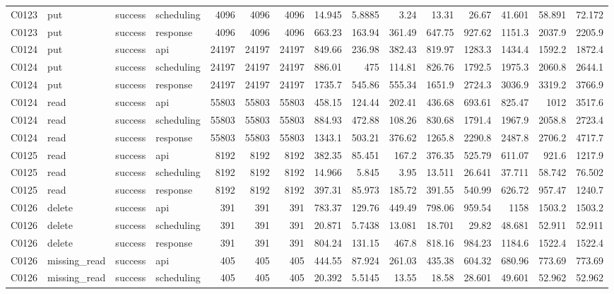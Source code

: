 \begin{landscape}
\begin{longtable}{llllrrrrrrrrrrr}
C0123 & put & success & scheduling & 4096 & 4096 & 4096 & 14.945 & 5.8885 & 3.24 & 13.31 & 26.67 & 41.601 & 58.891 & 72.172\\
C0123 & put & success & response & 4096 & 4096 & 4096 & 663.23 & 163.94 & 361.49 & 647.75 & 927.62 & 1151.3 & 2037.9 & 2205.9\\
C0124 & put & success & api & 24197 & 24197 & 24197 & 849.66 & 236.98 & 382.43 & 819.97 & 1283.3 & 1434.4 & 1592.2 & 1872.4\\
C0124 & put & success & scheduling & 24197 & 24197 & 24197 & 886.01 & 475 & 114.81 & 826.76 & 1792.5 & 1975.3 & 2060.8 & 2644.1\\
C0124 & put & success & response & 24197 & 24197 & 24197 & 1735.7 & 545.86 & 555.34 & 1651.9 & 2724.3 & 3036.9 & 3319.2 & 3766.9\\
C0124 & read & success & api & 55803 & 55803 & 55803 & 458.15 & 124.44 & 202.41 & 436.68 & 693.61 & 825.47 & 1012 & 3517.6\\
C0124 & read & success & scheduling & 55803 & 55803 & 55803 & 884.93 & 472.88 & 108.26 & 830.68 & 1791.4 & 1967.9 & 2058.8 & 2723.4\\
C0124 & read & success & response & 55803 & 55803 & 55803 & 1343.1 & 503.21 & 376.62 & 1265.8 & 2290.8 & 2487.8 & 2706.2 & 4717.7\\
C0125 & read & success & api & 8192 & 8192 & 8192 & 382.35 & 85.451 & 167.2 & 376.35 & 525.79 & 611.07 & 921.6 & 1217.9\\
C0125 & read & success & scheduling & 8192 & 8192 & 8192 & 14.966 & 5.845 & 3.95 & 13.511 & 26.641 & 37.711 & 58.742 & 76.502\\
C0125 & read & success & response & 8192 & 8192 & 8192 & 397.31 & 85.973 & 185.72 & 391.55 & 540.99 & 626.72 & 957.47 & 1240.7\\
C0126 & delete & success & api & 391 & 391 & 391 & 783.37 & 129.76 & 449.49 & 798.06 & 959.54 & 1158 & 1503.2 & 1503.2\\
C0126 & delete & success & scheduling & 391 & 391 & 391 & 20.871 & 5.7438 & 13.081 & 18.701 & 29.82 & 48.681 & 52.911 & 52.911\\
C0126 & delete & success & response & 391 & 391 & 391 & 804.24 & 131.15 & 467.8 & 818.16 & 984.23 & 1184.6 & 1522.4 & 1522.4\\
C0126 & missing\_\allowbreak{}read & success & api & 405 & 405 & 405 & 444.55 & 87.924 & 261.03 & 435.38 & 604.32 & 680.96 & 773.69 & 773.69\\
C0126 & missing\_\allowbreak{}read & success & scheduling & 405 & 405 & 405 & 20.392 & 5.5145 & 13.55 & 18.58 & 28.601 & 49.601 & 52.962 & 52.962\\

\end{longtable}
\end{landscape}
